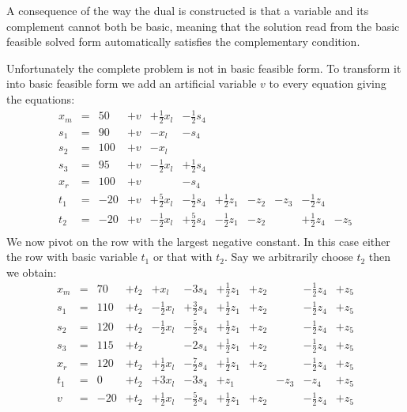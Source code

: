 \documentclass{article}
\begin{document}
A consequence of the way the dual is constructed is that a variable
and its complement cannot both be basic, meaning that the solution
read from the basic feasible
solved form automatically satisfies the complementary condition.

Unfortunately the complete problem
is not in basic feasible form. To transform it
into basic feasible form we add an artificial variable $v$
to every equation giving the equations:
\[
\begin{array}{rlrrrrrrrrr}
x_m & = &50 & + v & + \frac{1}{2} x_l & - \frac{1}{2} s_4 \\
s_1 & = &90  & + v & - x_l &  - s_4 \\
s_2 & = &100  & + v & - x_l \\
s_3 & = &95  & + v & - \frac{1}{2} x_l & + \frac{1}{2} s_4 \\
x_r & = &100  & + v &  & - s_4\\
t_1 & = &-20  & + v & + \frac{5}{2} x_l & - \frac{1}{2} s_4 &
        + \frac{1}{2} z_1 & - z_2 & - z_3 & - \frac{1}{2} z_4 & \\
t_2 & = &-20  & + v & - \frac{1}{2} x_l & + \frac{5}{2} s_4 &
        - \frac{1}{2} z_1 & - z_2 &  & + \frac{1}{2} z_4 & -z_5  \\
\end{array}
\]
We now pivot on the row with the largest negative constant. In this
case either the row with basic variable $t_1$ or that with $t_2$.
 Say we arbitrarily choose $t_2$
then we obtain:
\[
\begin{array}{rlrrrrrrrrr}
x_m & = & 70 & + t_2 &  + x_l & -3 s_4 &
        + \frac{1}{2} z_1 & + z_2 & &  -  \frac{1}{2} z_4 & + z_5 \\
s_1 & = & 110  & + t_2 & - \frac{1}{2} x_l &  + \frac{3}{2} s_4 &
        + \frac{1}{2} z_1 & + z_2 & &  -  \frac{1}{2} z_4 & + z_5 \\
s_2 & = &120  & + t_2 & - \frac{1}{2} x_l & - \frac{5}{2} s_4 &
        + \frac{1}{2} z_1 & + z_2 & &  -  \frac{1}{2} z_4 & + z_5 \\
s_3 & = & 115  & + t_2 &  & - 2 s_4 &
        + \frac{1}{2} z_1 & + z_2 & &  -  \frac{1}{2} z_4 & + z_5 \\
x_r & = &120  & + t_2 & + \frac{1}{2} x_l  & - \frac{7}{2}s_4 &
        + \frac{1}{2} z_1 & + z_2 & &  -  \frac{1}{2} z_4 & + z_5 \\
t_1 & = & 0  & + t_2 & + 3 x_l & -3 s_4 &
        + z_1 &  & - z_3 & - z_4 & + z_5\\
v & = &-20  & + t_2 & +  \frac{1}{2} x_l & - \frac{5}{2} s_4 &
        + \frac{1}{2} z_1 & + z_2 &  & -  \frac{1}{2} z_4 &  +z_5  \\
\end{array}
\]
\end{document}

